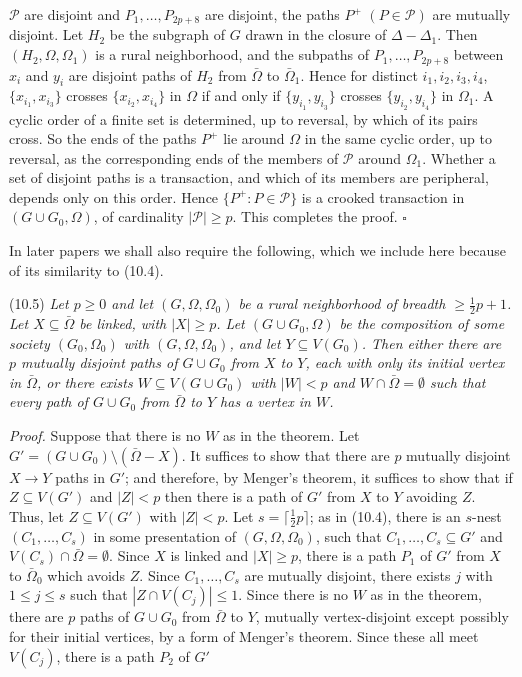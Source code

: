{$\mathscr{P}$ are disjoint and $P_1, \dots, P_{2p+8}$ are disjoint, the paths $P^+$
$(P \in \mathscr{P})$ are mutually disjoint. Let $H_2$ be the subgraph of $G$ drawn in the closure of
$\Delta - \Delta_1$. Then $(H_2, \Omega, \Omega_1)$ is a rural neighborhood, and the subpaths of
$P_1, \dots, P_{2p+8}$ between $x_i$ and $y_i$ are disjoint paths of $H_2$ from $\bar{\Omega}$ to
$\bar{\Omega}_1$. Hence for distinct $i_1, i_2, i_3, i_4$, $\{x_{i_1}, x_{i_3}\}$ crosses
$\{x_{i_2}, x_{i_4}\}$ in $\Omega$ if and only if $\{y_{i_1}, y_{i_3}\}$ crosses
$\{y_{i_2}, y_{i_4}\}$ in $\Omega_1$. A cyclic order of a finite set is determined, up to reversal, by
which of its pairs cross. So the ends of the paths $P^+$ lie around $\Omega$ in the same cyclic order,
up to reversal, as the corresponding ends of the members of $\mathscr{P}$ around $\Omega_1$. Whether a
set of disjoint paths is a transaction, and which of its members are peripheral, depends only on
this order. Hence $\{P^+ : P \in \mathscr{P}\}$ is a crooked transaction in $(G \cup G_0, \Omega)$,
of cardinality $|\mathscr{P}| \ge p$.} This completes the proof. $\square$

In later papers we shall also require the following, which we include here because of its similarity to (10.4).

\stmt
(10.5) \textit{Let $p \ge 0$ and let $(G, \Omega, \Omega_0)$ be a rural neighborhood of breadth $\ge \frac{1}{2} p + 1$. Let $X \subseteq \bar{\Omega}$ be linked, with $|X| \ge p$. Let $(G \cup G_0, \Omega)$ be the composition of some society $(G_0, \Omega_0)$ with $(G, \Omega, \Omega_0)$, and let $Y \subseteq V(G_0)$. Then either there are $p$ mutually disjoint paths of $G \cup G_0$ from $X$ to $Y$, each with only its initial vertex in $\bar{\Omega}$, or there exists $W \subseteq V(G \cup G_0)$ with $|W| < p$ and $W \cap \bar{\Omega} = \emptyset$ such that every path of $G \cup G_0$ from $\bar{\Omega}$ to $Y$ has a vertex in $W$.}

\textit{Proof.} Suppose that there is no $W$ as in the theorem. Let $G' = (G \cup G_0) \setminus (\bar{\Omega} - X)$. It suffices to show that there are $p$ mutually disjoint $X \to Y$ paths in $G'$; and therefore, by Menger's theorem, it suffices to show that if $Z \subseteq V(G')$ and $|Z| < p$ then there is a path of $G'$ from $X$ to $Y$ avoiding $Z$. Thus, let $Z \subseteq V(G')$ with $|Z| < p$. Let $s = \lceil \frac{1}{2} p \rceil$; as in (10.4), there is an $s$-nest $(C_1, \dots, C_s)$ in some presentation of $(G, \Omega, \Omega_0)$, such that $C_1, \dots, C_s \subseteq G'$ and $V(C_s) \cap \bar{\Omega} = \emptyset$. Since $X$ is linked and $|X| \ge p$, there is a path $P_1$ of $G'$ from $X$ to $\bar{\Omega}_0$ which avoids $Z$. Since $C_1, \dots, C_s$ are mutually disjoint, there exists $j$ with $1 \le j \le s$ such that $|Z \cap V(C_j)| \le 1$. Since there is no $W$ as in the theorem, there are $p$ paths of $G \cup G_0$ from $\bar{\Omega}$ to $Y$, mutually vertex-disjoint except possibly for their initial vertices, by a form of Menger's theorem. Since these all meet $V(C_j)$, there is a path $P_2$ of $G'$
